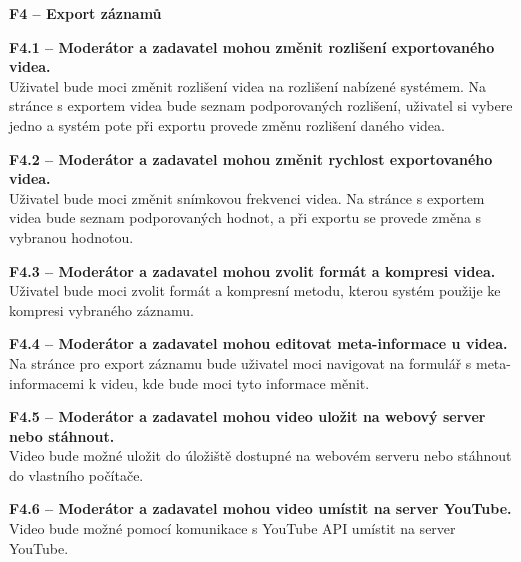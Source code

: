 \documentclass[thesis=M,czech]{FITthesis}[2012/06/26]
\begin{document}
\begin{description}
  \item \textbf{F4 -- Export záznamů}
  \begin{description}
    \item \textbf{F4.1 -- Moderátor a zadavatel mohou změnit rozlišení exportovaného videa.\\}
	Uživatel bude moci změnit rozlišení videa na rozlišení nabízené systémem. Na stránce s exportem videa bude seznam podporovaných rozlišení, uživatel si vybere jedno a systém pote při exportu provede změnu rozlišení daného videa.
    \item \textbf{F4.2 -- Moderátor a zadavatel mohou změnit rychlost exportovaného videa.\\}
	Uživatel bude moci změnit snímkovou frekvenci videa. Na stránce s exportem videa bude seznam podporovaných hodnot, a při exportu se provede změna s vybranou hodnotou.
    \item \textbf{F4.3 -- Moderátor a zadavatel mohou zvolit formát a kompresi videa.\\}
	Uživatel bude moci zvolit formát a kompresní metodu, kterou systém použije ke kompresi vybraného záznamu.
    \item \textbf{F4.4 -- Moderátor a zadavatel mohou editovat meta-informace u videa.\\}
	Na stránce pro export záznamu bude uživatel moci navigovat na formulář s meta-informacemi k videu, kde bude moci tyto informace měnit.
    \item \textbf{F4.5 -- Moderátor a zadavatel mohou video uložit na webový server nebo stáhnout.\\}
	Video bude možné uložit do úložiště dostupné na webovém serveru nebo stáhnout do vlastního počítače.
    \item \textbf{F4.6 -- Moderátor a zadavatel mohou video umístit na server YouTube.\\}
	Video bude možné pomocí komunikace s YouTube API umístit na server YouTube.
  \end{description}


\end{description}
\end{document}
